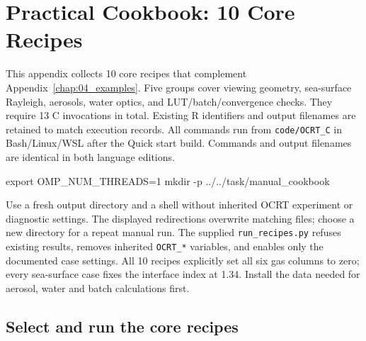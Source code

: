 
\chapter{Practical Cookbook: 10 Core Recipes}

\label{chap:09_cookbook}

This appendix collects 10 core recipes that complement Appendix~\ref{chap:04_examples}. Five groups cover viewing geometry, sea-surface Rayleigh, aerosols, water optics, and LUT/batch/convergence checks. They require 13 C invocations in total. Existing R identifiers and output filenames are retained to match execution records. All commands run from \texttt{code/\allowbreak{}OCRT\_\allowbreak{}C} in Bash/Linux/WSL after the Quick start build. Commands and output filenames are identical in both language editions.

\noindent\begin{minipage}{\linewidth}
\begin{ManualCode}

export OMP_NUM_THREADS=1
mkdir -p ../../task/manual_cookbook

\end{ManualCode}
\end{minipage}\par

Use a fresh output directory and a shell without inherited OCRT experiment or diagnostic settings. The displayed redirections overwrite matching files; choose a new directory for a repeat manual run. The supplied \texttt{run\_\allowbreak{}recipes.py} refuses existing results, removes inherited \texttt{OCRT\_\allowbreak{}*} variables, and enables only the documented case settings. All 10 recipes explicitly set all six gas columns to zero; every sea-surface case fixes the interface index at 1.34. Install the data needed for aerosol, water and batch calculations first.

\clearpage

\section{Select and run the core recipes}

\label{sec:auto:09_cookbook:1}

\label{sec:cookbook_selection}

